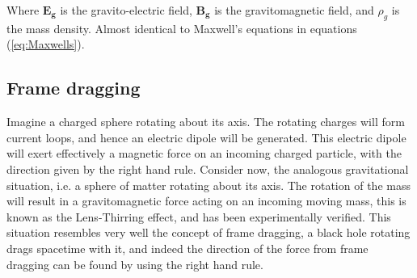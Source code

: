 Where $\mathbf{E_g}$ is the gravito-electric field, $\mathbf{B_g}$ is the gravitomagnetic field, and $\rho_g$ is the mass density. Almost identical to Maxwell's equations in equations (\ref{eq:Maxwells}).



\subsection{Frame dragging}

















Imagine a charged sphere rotating about its axis. The rotating charges will form current loops, and hence an electric dipole will be generated. This electric dipole will exert effectively a magnetic force on an incoming charged particle, with the direction given by the right hand rule. Consider now, the analogous gravitational situation, i.e. a sphere of matter rotating about its axis. The rotation of the mass will result in a gravitomagnetic force acting on an incoming moving mass, this is known as the Lens-Thirring effect, and has been experimentally verified. This situation resembles very well the concept of frame dragging, a black hole rotating drags spacetime with it, and indeed the direction of the force from frame dragging can be found by using the right hand rule.


